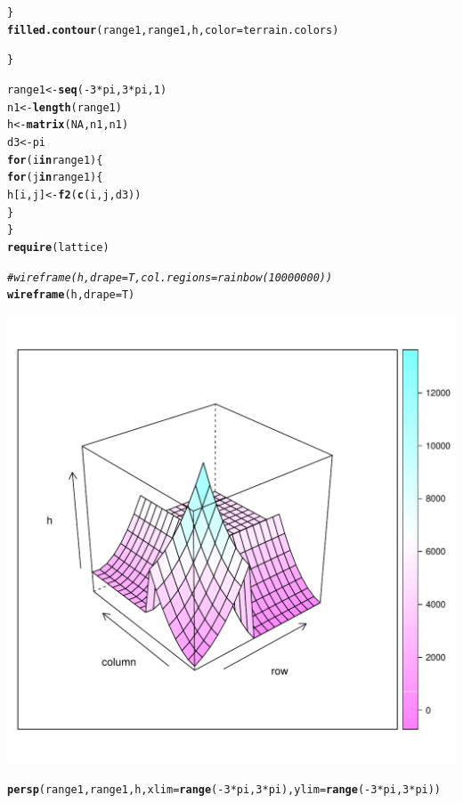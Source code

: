 \documentclass{article}\usepackage[]{graphicx}\usepackage[]{color}
\makeatletter
\def\maxwidth{ %
  \ifdim\Gin@nat@width>\linewidth
    \linewidth
  \else
    \Gin@nat@width
  \fi
}
\newcommand{\hlnum}[1]{\textcolor[rgb]{0.686,0.059,0.569}{#1}}%
\newcommand{\hlcom}[1]{\textcolor[rgb]{0.678,0.584,0.686}{\textit{#1}}}%
\newcommand{\hlopt}[1]{\textcolor[rgb]{0,0,0}{#1}}%
\newcommand{\hlstd}[1]{\textcolor[rgb]{0.345,0.345,0.345}{#1}}%
\newcommand{\hlkwa}[1]{\textcolor[rgb]{0.161,0.373,0.58}{\textbf{#1}}}%
\newcommand{\hlkwb}[1]{\textcolor[rgb]{0.69,0.353,0.396}{#1}}%
\newcommand{\hlkwc}[1]{\textcolor[rgb]{0.333,0.667,0.333}{#1}}%
\newcommand{\hlkwd}[1]{\textcolor[rgb]{0.737,0.353,0.396}{\textbf{#1}}}%
\newenvironment{kframe}{%
 \def\at@end@of@kframe{}%
 \ifinner\ifhmode%
  \def\at@end@of@kframe{\end{minipage}}%
  \begin{minipage}{\columnwidth}%
 \fi\fi%
 \def\FrameCommand##1{\hskip\@totalleftmargin \hskip-\fboxsep
 \colorbox{shadecolor}{##1}\hskip-\fboxsep
     \hskip-\linewidth \hskip-\@totalleftmargin \hskip\columnwidth}%
 \MakeFramed {\advance\hsize-\width
   \@totalleftmargin\z@ \linewidth\hsize
   \@setminipage}}%
 {\par\unskip\endMakeFramed%
 \at@end@of@kframe}
\newenvironment{knitrout}{}{} %
\makeatother
\begin{document}
\begin{knitrout}
\begin{kframe}
\begin{alltt}
  \hlstd{\}}
  \hlkwd{filled.contour}\hlstd{(range1,range1,h,} \hlkwc{color} \hlstd{= terrain.colors)}

\hlstd{\}}

\hlstd{range1} \hlkwb{<-} \hlkwd{seq}\hlstd{(}\hlopt{-}\hlnum{3}\hlopt{*}\hlstd{pi,}\hlnum{3}\hlopt{*}\hlstd{pi,}\hlnum{1}\hlstd{)}
\hlstd{n1} \hlkwb{<-} \hlkwd{length}\hlstd{(range1)}
\hlstd{h} \hlkwb{<-} \hlkwd{matrix}\hlstd{(}\hlnum{NA}\hlstd{,n1,n1)}
\hlstd{d3} \hlkwb{<-} \hlstd{pi}
\hlkwa{for} \hlstd{(i} \hlkwa{in} \hlstd{range1)\{}
  \hlkwa{for}\hlstd{(j} \hlkwa{in} \hlstd{range1)\{}
    \hlstd{h[i,j]} \hlkwb{<-} \hlkwd{f2}\hlstd{(}\hlkwd{c}\hlstd{(i,j,d3))}
  \hlstd{\}}
\hlstd{\}}
\hlkwd{require}\hlstd{(lattice)}
\end{alltt}


{\ttfamily\noindent\itshape\color{messagecolor}{\#\# Loading required package: lattice}}\begin{alltt}
\hlcom{#wireframe(h, drape=T, col.regions=rainbow(10000000))}
\hlkwd{wireframe}\hlstd{(h,} \hlkwc{drape}\hlstd{=T)}
\end{alltt}
\end{kframe}
\includegraphics[width=\maxwidth]{figure/unnamed-chunk-4-1} 
\begin{kframe}\begin{alltt}
\hlkwd{persp}\hlstd{(range1,range1,h,}\hlkwc{xlim} \hlstd{=} \hlkwd{range}\hlstd{(}\hlopt{-}\hlnum{3}\hlopt{*}\hlstd{pi,}\hlnum{3}\hlopt{*}\hlstd{pi),} \hlkwc{ylim} \hlstd{=} \hlkwd{range}\hlstd{(}\hlopt{-}\hlnum{3}\hlopt{*}\hlstd{pi,}\hlnum{3}\hlopt{*}\hlstd{pi))}

\end{alltt}
\end{kframe}
\end{knitrout}
\end{document}
